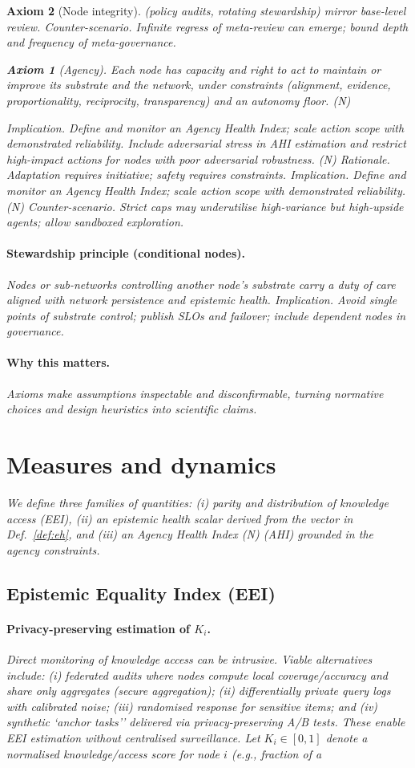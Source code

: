 \documentclass[12pt]{article}
\newtheorem{axiom}{Axiom}
\begin{document}
\begin{axiom}[Node integrity]
(policy audits, rotating stewardship) mirror base-level review. \emph{Counter-scenario.} Infinite regress of meta-review can emerge; bound depth and frequency of meta-governance. \begin{axiom}[Agency] Each node has capacity and right to act to maintain or improve its substrate and the network, under constraints (alignment, evidence, proportionality, reciprocity, transparency) and an autonomy floor. (N) \end{axiom} \emph{Implication.} Define and monitor an Agency Health Index; scale action scope with demonstrated reliability. Include adversarial stress in AHI estimation and restrict high-impact actions for nodes with poor adversarial robustness. (N) \emph{Rationale.} Adaptation requires initiative; safety requires constraints. \emph{Implication.} Define and monitor an Agency Health Index; scale action scope with demonstrated reliability. (N) \emph{Counter-scenario.} Strict caps may underutilise high-variance but high-upside agents; allow sandboxed exploration. \paragraph{Stewardship principle (conditional nodes).} Nodes or sub-networks controlling another node's substrate carry a duty of care aligned with network persistence and epistemic health. \emph{Implication.} Avoid single points of substrate control; publish SLOs and failover; include dependent nodes in governance. \paragraph{Why this matters.} Axioms make assumptions inspectable and disconfirmable, turning normative choices and design heuristics into scientific claims. \section{Measures and dynamics} We define three families of quantities: (i) \emph{parity and distribution} of knowledge access (EEI), (ii) an \emph{epistemic health scalar} derived from the vector in Def.~\ref{def:eh}, and (iii) an \emph{Agency Health Index (N)} (AHI) grounded in the agency constraints. \subsection{Epistemic Equality Index (EEI)} \paragraph{Privacy-preserving estimation of $K_i$.} Direct monitoring of knowledge access can be intrusive. Viable alternatives include: (i) federated audits where nodes compute local coverage/accuracy and share only aggregates (secure aggregation); (ii) differentially private query logs with calibrated noise; (iii) randomised response for sensitive items; and (iv) synthetic `anchor tasks'' delivered via privacy-preserving A/B tests. These enable EEI estimation without centralised surveillance. Let $K_i\in[0,1]$ denote a normalised knowledge/access score for node $i$ (e.g., fraction of a 
\end{axiom}
\end{document}
